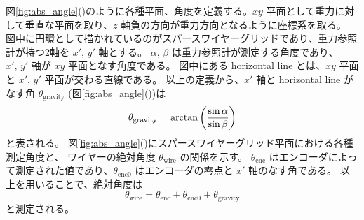 \documentclass[../../main.tex]{subfiles}
\begin{document}
図\ref{fig:abs_angle}()のように各種平面、角度を定義する。$xy$ 平面として重力に対して垂直な平面を取り、$z$ 軸負の方向が重力方向となるように座標系を取る。
図中に円環として描かれているのがスパースワイヤーグリッドであり、重力参照計が持つ2軸を $x',\,y'$ 軸とする。
$\alpha,\,\beta$ は重力参照計が測定する角度であり、$x',\,y'$ 軸が $xy$ 平面となす角度である。
図中にある horizontal line とは、$xy$ 平面と $x',\,y'$ 平面が交わる直線である。
以上の定義から、$x'$ 軸と horizontal line がなす角 $\theta_{\mathrm{gravity}}$ (図\ref{fig:abs_angle}())は
\begin{equation}
    \theta_{\mathrm{gravity}} = \arctan\qty(\dfrac{\sin\alpha}{\sin\beta})
    \label{eq:wg_theta_sens}
\end{equation}
と表される\cite{swg:Murata_2023}。
図\ref{fig:abs_angle}()にスパースワイヤーグリッド平面における各種測定角度と、
ワイヤーの絶対角度 $\theta_{\mathrm{wire}}$ の関係を示す。
$\theta_{\mathrm{enc}}$ はエンコーダによって測定された値であり、$\theta_{\mathrm{enc}0}$ はエンコーダの零点と $x'$ 軸のなす角である。
以上を用いることで、絶対角度は
\begin{equation}
    \theta_{\mathrm{wire}} = \theta_{\mathrm{enc}} + \theta_{\mathrm{enc}0} + \theta_{\mathrm{gravity}}
\end{equation}
と測定される。
\end{document}
